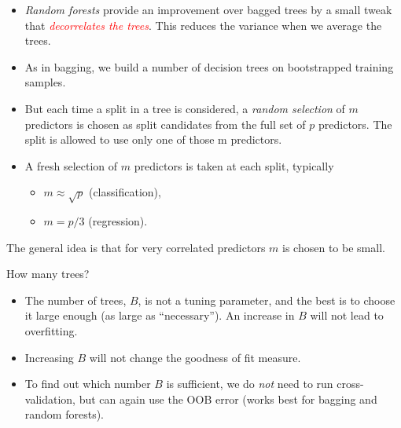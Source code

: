 \documentclass[
  10pt,
  ignorenonframetext,
]{beamer}
\providecommand{\tightlist}{%
  \setlength{\itemsep}{0pt}\setlength{\parskip}{0pt}}
\begin{document}
\begin{frame}
\begin{itemize}
\item
  \emph{Random forests} provide an improvement over bagged trees by a
  small tweak that \emph{\textcolor{red}{decorrelates the trees}}. This
  reduces the variance when we average the trees.
\item
  As in bagging, we build a number of decision trees on bootstrapped
  training samples.
\item
  But each time a split in a tree is considered, a \emph{random
  selection} of \(m\) predictors is chosen as split candidates from the
  full set of \(p\) predictors. The split is allowed to use only one of
  those m predictors.
\item
  A fresh selection of \(m\) predictors is taken at each split,
  typically

  \begin{itemize}
  \tightlist
  \item
    \(m\approx \sqrt p\) (classification),\\
  \item
    \(m=p/3\) (regression).
  \end{itemize}
\end{itemize}

\vspace{2mm}

The general idea is that for very correlated predictors \(m\) is chosen
to be small.
\end{frame}

\begin{frame}
\begin{block}{How many trees?}
\protect\hypertarget{how-many-trees}{}
\vspace{2mm}

\begin{itemize}
\tightlist
\item
  The number of trees, \(B\), is not a tuning parameter, and the best is
  to choose it large enough (as large as ``necessary''). An increase in
  \(B\) will not lead to overfitting.
\end{itemize}

\vspace{2mm}

\begin{itemize}
\tightlist
\item
  Increasing \(B\) will not change the goodness of fit measure.
\end{itemize}

\vspace{2mm}

\begin{itemize}
\tightlist
\item
  To find out which number \(B\) is sufficient, we do \emph{not} need to
  run cross-validation, but can again use the OOB error (works best for
  bagging and random forests).
\end{itemize}
\end{block}
\end{frame}
\end{document}
